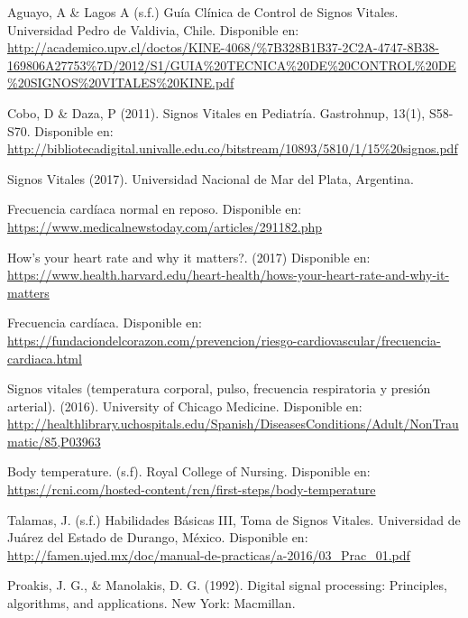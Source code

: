 \begin{thebibliography}{0}
	
	
	 Aguayo, A \& Lagos A (s.f.) Guía Clínica de Control de Signos Vitales. Universidad Pedro de Valdivia, Chile. Disponible en: \url{http://academico.upv.cl/doctos/KINE-4068/\%7B328B1B37-2C2A-4747-8B38-169806A27753%7D/2012/S1/GUIA%20TECNICA%20DE%20CONTROL%20DE%20SIGNOS%20VITALES%20KINE.pdf}
	
	 Cobo, D \& Daza, P (2011). Signos Vitales en Pediatría. Gastrohnup, 13(1), S58-S70. Disponible en: \url{http://bibliotecadigital.univalle.edu.co/bitstream/10893/5810/1/15%20signos.pdf} 
		
	 Signos Vitales (2017). Universidad Nacional de Mar del Plata, Argentina. 
		
	 Frecuencia cardíaca normal en reposo. Disponible en: \url{https://www.medicalnewstoday.com/articles/291182.php}
	
	 How’s your heart rate and why it matters?. (2017) Disponible en: \url{https://www.health.harvard.edu/heart-health/hows-your-heart-rate-and-why-it-matters}

	 Frecuencia cardíaca. Disponible en: \url{https://fundaciondelcorazon.com/prevencion/riesgo-cardiovascular/frecuencia-cardiaca.html}

	
	
	 Signos vitales (temperatura corporal, pulso, frecuencia respiratoria y presión arterial). (2016). University of Chicago Medicine. Disponible en: \url{http://healthlibrary.uchospitals.edu/Spanish/DiseasesConditions/Adult/NonTraumatic/85,P03963}
	
	 Body temperature. (s.f). Royal College of Nursing. Disponible en: \url{https://rcni.com/hosted-content/rcn/first-steps/body-temperature}
	
	 Talamas, J. (s.f.) Habilidades Básicas III, Toma de Signos Vitales. Universidad de Juárez del Estado de Durango, México. Disponible en: \url{http://famen.ujed.mx/doc/manual-de-practicas/a-2016/03_Prac_01.pdf}
	
	 Proakis, J. G., \& Manolakis, D. G. (1992). Digital signal processing: Principles, algorithms, and applications. New York: Macmillan.
	

\end{thebibliography}
